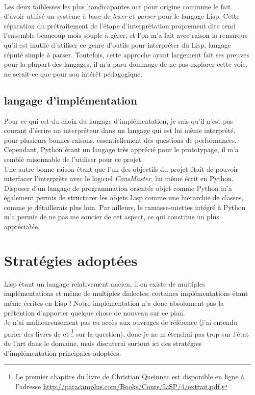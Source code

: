 \documentclass{article}
\begin{document}
\paragraph{}
Les deux faiblesses les plus handicapantes ont pour origine commune le fait d'avoir utilisé un système à base de 
\emph{lexer} et \emph{parser} pour le langage Lisp. 
Cette séparation du prétraitement de l'étape d'interprétation proprement dite rend l'ensemble beaucoup 
mois souple à gérer, et l'on m'a fait avec raison la remarque qu'il est inutile d'utiliser ce genre d'outils pour 
interpréter du Lisp, langage réputé simple à parser. 
Toutefois, cette approche ayant largement fait ses preuves pour la plupart des langages, il m'a paru dommage de ne pas explorer 
cette voie, ne serait-ce que pour son intérêt pédagogique.
\subsection{langage d'implémentation}
Pour ce qui est du choix du langage d'implémentation, je sais qu'il n'est pas courant d'écrire un interpréteur dans un langage
qui est lui même interprété, pour plusieurs bonnes raisons, essentiellement des questions de performances. 
Cependant, Python étant un langage très apprécié pour le prototypage, il m'a semblé raisonnable de l'utiliser pour ce projet.
\\
Une autre bonne raison étant que l'un des objectifs du projet était de pouvoir interfacer l'interprète 
avec le logiciel \emph{ConsMaster}, lui même écrit en Python.
\\
Disposer d'un langage de programmation orientée objet comme Python m'a également permis de structurer les objets Lisp 
comme une hiérarchie de classes, comme je détaillerais plus loin. Par ailleurs, le ramasse-miettes intégré à Python m'a permis
de ne pas me soucier de cet aspect, ce qui constitue un plus appréciable.

\section{Stratégies adoptées}


Lisp étant un langage relativement ancien, il en existe de multiples implémentations et même de multiples dialectes,
certaines implémentations étant même écrites en Lisp !
Notre implémentation n'a donc absolument pas la prétention d'apporter quelque chose de nouveau sur ce plan.
\\
Je n'ai malheureusement pas eu accès aux ouvrages de référence (j'ai entendu parler des livres de
\cite{allen_anatomy_1978} et \cite{queinnec_principes_2007} 
      \footnote{Le premier chapitre du livre de Christian Queinnec est disponible en ligne à l'adresse 
	  \url{http://paracamplus.com/Books/Cours/LiSP/4/extrait.pdf}.}
sur la question), 
donc je ne m'étendrai pas trop sur l'état de l'art dans le domaine, mais discuterai surtout ici 
des stratégies d'implémentation principales adoptées.
\end{document}
